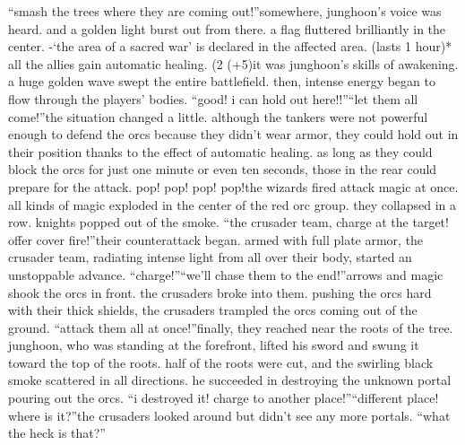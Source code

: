 “smash the trees where they are coming out!”somewhere, junghoon’s voice was heard.
 and a golden light burst out from there.
a flag fluttered brilliantly in the center.
-‘the area of a sacred war’ is declared in the affected area.
 (lasts 1 hour)* all the allies gain automatic healing.
 (2%
 (+5)it was junghoon’s skills of awakening.
 a huge golden wave swept the entire battlefield.
then, intense energy began to flow through the players’ bodies.
“good! i can hold out here!!”“let them all come!”the situation changed a little.
 although the tankers were not powerful enough to defend the orcs because they didn’t wear armor, they could hold out in their position thanks to the effect of automatic healing.
as long as they could block the orcs for just one minute or even ten seconds, those in the rear could prepare for the attack.
pop! pop! pop! pop!the wizards fired attack magic at once.
 all kinds of magic exploded in the center of the red orc group.
 they collapsed in a row.
 knights popped out of the smoke.
“the crusader team, charge at the target! offer cover fire!”their counterattack began.
 armed with full plate armor, the crusader team, radiating intense light from all over their body, started an unstoppable advance.
“charge!”“we’ll chase them to the end!”arrows and magic shook the orcs in front.
 the crusaders broke into them.
 pushing the orcs hard with their thick shields, the crusaders trampled the orcs coming out of the ground.
“attack them all at once!”finally, they reached near the roots of the tree.
junghoon, who was standing at the forefront, lifted his sword and swung it toward the top of the roots.
half of the roots were cut, and the swirling black smoke scattered in all directions.
 he succeeded in destroying the unknown portal pouring out the orcs.
“i destroyed it! charge to another place!”“different place! where is it?”the crusaders looked around but didn’t see any more portals.
“what the heck is that?”

